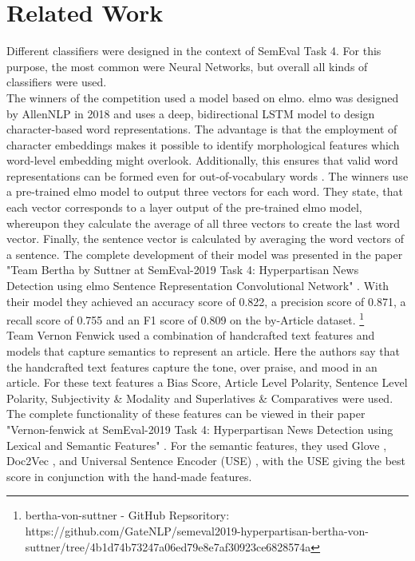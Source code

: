 \documentclass[a4paper, 11pt,titlepage,oneside,openany]{book}
\begin{document}
\chapter{Related Work}
Different classifiers were designed in the context of SemEval Task 4. For this purpose, the most common were Neural Networks, but overall all kinds of classifiers were used. \\
\indent The winners of the competition used a model based on \gls{elmo}. \gls{elmo} was designed by AllenNLP in 2018 and uses a deep, bidirectional LSTM model to design character-based word representations. The advantage is that the employment of character embeddings makes it possible to identify morphological features which word-level embedding might overlook. Additionally, this ensures that valid word representations can be formed even for out-of-vocabulary words \cite{elmo}. The winners use a pre-trained \gls{elmo} model to output three vectors for each word. They state, that each vector corresponds to a layer output of the pre-trained \gls{elmo} model, whereupon they calculate the average of all three vectors to create the last word vector. Finally, the sentence vector is calculated by averaging the word vectors of a sentence. The complete development of their model was presented in the paper "Team Bertha by Suttner at SemEval-2019 Task 4: Hyperpartisan News Detection using \gls{elmo} Sentence Representation Convolutional Network" \cite{gewinner}. With their model they achieved an accuracy score of 0.822, a precision score of 0.871, a recall score of 0.755 and an F1 score of 0.809 on the by-Article dataset. \footnote{bertha-von-suttner - GitHub Repsoritory: https://github.com/GateNLP/semeval2019-hyperpartisan-bertha-von-suttner/tree/4b1d74b73247a06ed79e8e7af30923ce6828574a} \\
\indent Team Vernon Fenwick used a combination of handcrafted text features and models that capture semantics to represent an article. Here the authors say that the handcrafted text features capture the tone, over praise, and mood in an article. For these text features a Bias Score, Article Level Polarity, Sentence Level Polarity, Subjectivity \& Modality and Superlatives \& Comparatives were used. The complete functionality of these features can be viewed in their paper "Vernon-fenwick at SemEval-2019 Task 4: Hyperpartisan News Detection using Lexical and Semantic Features" \cite{vernon}. For the semantic features, they used Glove \cite{glove}, Doc2Vec \cite{doc2vec}, and Universal Sentence Encoder (USE) \cite{use}, with the USE giving the best score in conjunction with the hand-made features. 
\end{document}
